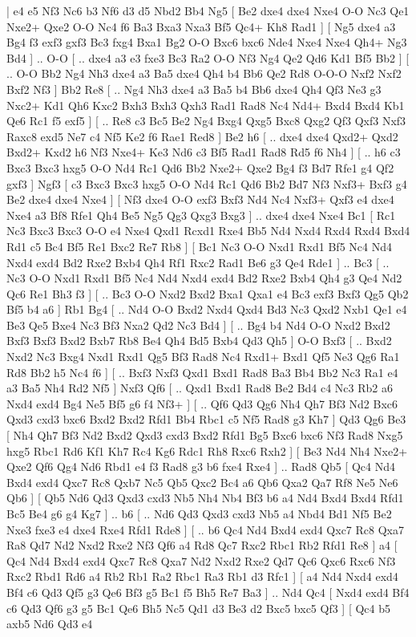 \makegametitle 
|   e4   e5    Nf3   Nc6    b3   Nf6    d3   d5    Nbd2   Bb4    Ng5 [  Be2 dxe4  dxe4 Nxe4  O-O Nc3  Qe1 Nxe2+  Qxe2 O-O  Nc4 f6  Ba3 Bxa3  Nxa3 Bf5  Qc4+ Kh8  Rad1   ]  [  Ng5 dxe4  a3 Bg4  f3 exf3  gxf3 Bc3  fxg4 Bxa1  Bg2 O-O  Bxc6 bxc6  Nde4 Nxe4  Nxe4 Qh4+  Ng3 Bd4   ] .. O-O [ .. dxe4  a3 e3  fxe3 Bc3  Ra2 O-O  Nf3 Ng4  Qe2 Qd6  Kd1 Bf5  Bb2   ]  [ .. O-O  Bb2 Ng4  Nh3 dxe4  a3 Ba5  dxe4 Qh4  b4 Bb6  Qe2 Rd8  O-O-O Nxf2  Nxf2 Bxf2  Nf3   ]  Bb2   Re8 [ .. Ng4  Nh3 dxe4  a3 Ba5  b4 Bb6  dxe4 Qh4  Qf3 Ne3  g3 Nxc2+  Kd1 Qh6  Kxc2 Bxh3  Bxh3 Qxh3  Rad1 Rad8  Nc4 Nd4+  Bxd4 Bxd4  Kb1 Qe6  Rc1 f5  exf5   ]  [ .. Re8  c3 Bc5  Be2 Ng4  Bxg4 Qxg5  Bxc8 Qxg2  Qf3 Qxf3  Nxf3 Raxc8  exd5 Ne7  c4 Nf5  Ke2 f6  Rae1 Red8   ]  Be2   h6 [ .. dxe4  dxe4 Qxd2+  Qxd2 Bxd2+  Kxd2 h6  Nf3 Nxe4+  Ke3 Nd6  c3 Bf5  Rad1 Rad8  Rd5 f6  Nh4   ]  [ .. h6  c3 Bxc3  Bxc3 hxg5  O-O Nd4  Rc1 Qd6  Bb2 Nxe2+  Qxe2 Bg4  f3 Bd7  Rfe1 g4  Qf2 gxf3   ]  Ngf3 [  c3 Bxc3  Bxc3 hxg5  O-O Nd4  Rc1 Qd6  Bb2 Bd7  Nf3 Nxf3+  Bxf3 g4  Be2 dxe4  dxe4 Nxe4   ]  [  Nf3 dxe4  O-O exf3  Bxf3 Nd4  Nc4 Nxf3+  Qxf3 e4  dxe4 Nxe4  a3 Bf8  Rfe1 Qh4  Be5 Ng5  Qg3 Qxg3  Bxg3   ] .. dxe4    dxe4   Nxe4    Bc1 [  Rc1 Nc3  Bxc3 Bxc3  O-O e4  Nxe4 Qxd1  Rcxd1 Rxe4  Bb5 Nd4  Nxd4 Rxd4  Rxd4 Bxd4  Rd1 c5  Bc4 Bf5  Re1 Bxc2  Re7 Rb8   ]  [  Bc1 Nc3  O-O Nxd1  Rxd1 Bf5  Nc4 Nd4  Nxd4 exd4  Bd2 Rxe2  Bxb4 Qh4  Rf1 Rxc2  Rad1 Be6  g3 Qe4  Rde1   ] .. Bc3 [ .. Nc3  O-O Nxd1  Rxd1 Bf5  Nc4 Nd4  Nxd4 exd4  Bd2 Rxe2  Bxb4 Qh4  g3 Qe4  Nd2 Qc6  Re1 Bh3  f3   ]  [ .. Bc3  O-O Nxd2  Bxd2 Bxa1  Qxa1 e4  Bc3 exf3  Bxf3 Qg5  Qb2 Bf5  b4 a6   ]  Rb1   Bg4 [ .. Nd4  O-O Bxd2  Nxd4 Qxd4  Bd3 Nc3  Qxd2 Nxb1  Qe1 e4  Be3 Qe5  Bxe4 Nc3  Bf3 Nxa2  Qd2 Nc3  Bd4   ]  [ .. Bg4  b4 Nd4  O-O Nxd2  Bxd2 Bxf3  Bxf3 Bxd2  Bxb7 Rb8  Be4 Qh4  Bd5 Bxb4  Qd3 Qh5   ]  O-O   Bxf3 [ .. Bxd2  Nxd2 Nc3  Bxg4 Nxd1  Rxd1 Qg5  Bf3 Rad8  Nc4 Rxd1+  Bxd1 Qf5  Ne3 Qg6  Ra1 Rd8  Bb2 h5  Nc4 f6   ]  [ .. Bxf3  Nxf3 Qxd1  Bxd1 Rad8  Ba3 Bb4  Bb2 Nc3  Ra1 e4  a3 Ba5  Nh4 Rd2  Nf5   ]  Nxf3   Qf6 [ .. Qxd1  Bxd1 Rad8  Be2 Bd4  c4 Nc3  Rb2 a6  Nxd4 exd4  Bg4 Ne5  Bf5 g6  f4 Nf3+   ]  [ .. Qf6  Qd3 Qg6  Nh4 Qh7  Bf3 Nd2  Bxc6 Qxd3  cxd3 bxc6  Bxd2 Bxd2  Rfd1 Bb4  Rbc1 c5  Nf5 Rad8  g3 Kh7   ]  Qd3   Qg6    Be3 [  Nh4 Qh7  Bf3 Nd2  Bxd2 Qxd3  cxd3 Bxd2  Rfd1 Bg5  Bxc6 bxc6  Nf3 Rad8  Nxg5 hxg5  Rbc1 Rd6  Kf1 Kh7  Rc4 Kg6  Rdc1 Rh8  Rxc6 Rxh2   ]  [  Be3 Nd4  Nh4 Nxe2+  Qxe2 Qf6  Qg4 Nd6  Rbd1 e4  f3 Rad8  g3 b6  fxe4 Rxe4   ] .. Rad8    Qb5 [  Qc4 Nd4  Bxd4 exd4  Qxc7 Rc8  Qxb7 Nc5  Qb5 Qxc2  Bc4 a6  Qb6 Qxa2  Qa7 Rf8  Ne5 Ne6  Qb6   ]  [  Qb5 Nd6  Qd3 Qxd3  cxd3 Nb5  Nh4 Nb4  Bf3 b6  a4 Nd4  Bxd4 Bxd4  Rfd1 Bc5  Be4 g6  g4 Kg7   ] .. b6 [ .. Nd6  Qd3 Qxd3  cxd3 Nb5  a4 Nbd4  Bd1 Nf5  Be2 Nxe3  fxe3 e4  dxe4 Rxe4  Rfd1 Rde8   ]  [ .. b6  Qc4 Nd4  Bxd4 exd4  Qxc7 Rc8  Qxa7 Ra8  Qd7 Nd2  Nxd2 Rxe2  Nf3 Qf6  a4 Rd8  Qc7 Rxc2  Rbc1 Rb2  Rfd1 Re8   ]  a4 [  Qc4 Nd4  Bxd4 exd4  Qxc7 Rc8  Qxa7 Nd2  Nxd2 Rxe2  Qd7 Qc6  Qxc6 Rxc6  Nf3 Rxc2  Rbd1 Rd6  a4 Rb2  Rb1 Ra2  Rbc1 Ra3  Rb1 d3  Rfc1   ]  [  a4 Nd4  Nxd4 exd4  Bf4 c6  Qd3 Qf5  g3 Qe6  Bf3 g5  Bc1 f5  Bh5 Re7  Ba3   ] .. Nd4    Qc4 [  Nxd4 exd4  Bf4 c6  Qd3 Qf6  g3 g5  Bc1 Qe6  Bh5 Nc5  Qd1 d3  Be3 d2  Bxc5 bxc5  Qf3   ]  [  Qc4 b5  axb5 Nd6  Qd3 e4  